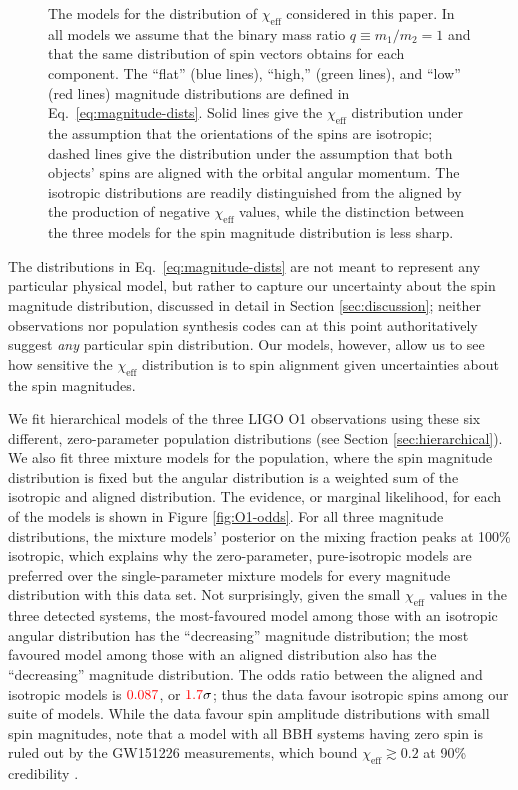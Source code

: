 \documentclass[modern,linenumbers]{aastex61}
\newcommand{\chieff}{\chi_\mathrm{eff}}
\newcommand{\checkme}[1]{\textcolor{red}{#1}}
\newcommand{\OOneSigmaIsoAligned}{\checkme{1.7}}
\newcommand{\OOneOddsIsoAligned}{\checkme{0.087}}
\begin{document}
\begin{figure}
  \caption{\label{fig:chieff-distribution-models} The models for the
    distribution of $\chieff$ considered in this paper.  In all models
    we assume that the binary mass ratio $q \equiv m_1/m_2 = 1$ and
    that the same distribution of spin vectors obtains for each
    component.  The ``flat'' (blue lines), ``high,'' (green
    lines), and ``low'' (red lines) magnitude distributions are
    defined in Eq.\ \eqref{eq:magnitude-dists}.  Solid lines give the
    $\chieff$ distribution under the assumption that the orientations
    of the spins are isotropic; dashed lines give the distribution
    under the assumption that both objects' spins are aligned with the
    orbital angular momentum.  The isotropic distributions are readily
    distinguished from the aligned by the production of negative
    $\chieff$ values, while the distinction between the three models
    for the spin magnitude distribution is less sharp.}
\end{figure}

The distributions in Eq.\ \eqref{eq:magnitude-dists} are not meant to
represent any particular physical model, but rather to capture our
uncertainty about the spin magnitude distribution, discussed in detail
in Section \ref{sec:discussion}; neither observations nor population
synthesis codes can at this point authoritatively suggest {\it any}
particular spin distribution.  Our models, however, allow us to see
how sensitive the $\chieff$ distribution is to spin alignment given
uncertainties about the spin magnitudes.

We fit hierarchical models of the three LIGO O1 observations using
these six different, zero-parameter population distributions (see
Section \ref{sec:hierarchical}).  We also fit three mixture models for
the population, where the spin magnitude distribution is fixed but the
angular distribution is a weighted sum of the isotropic and aligned
distribution.  The evidence, or marginal likelihood, for each of the
models is shown in Figure \ref{fig:O1-odds}.  For all three magnitude
distributions, the mixture models' posterior on the mixing fraction
peaks at 100\% isotropic, which explains why the zero-parameter,
pure-isotropic models are preferred over the single-parameter mixture
models for every magnitude distribution with this data set.  Not
surprisingly, given the small $\chieff$ values in the three detected
systems, the most-favoured model among those with an isotropic angular
distribution has the ``decreasing'' magnitude distribution; the most
favoured model among those with an aligned distribution also has the
``decreasing'' magnitude distribution.  The odds ratio between the
aligned and isotropic models is $\OOneOddsIsoAligned$, or
$\OOneSigmaIsoAligned\sigma$; thus the data favour isotropic spins
among our suite of models.  While the data favour spin amplitude
distributions with small spin magnitudes, note that a model with all
\ac{BBH} systems having zero spin is ruled out by the GW151226
measurements, which bound $\chieff \gtrsim 0.2$ at 90\% credibility
\citep{2016PhRvL.116x1103A}.
\end{document}
